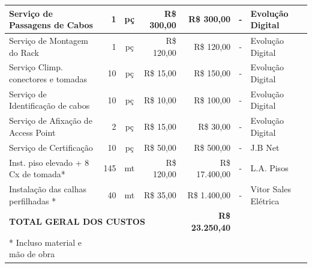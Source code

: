 \documentclass[	DIV=calc,%
							paper=a4,%
							fontsize=12pt,%
							onecolumn]{scrartcl}	 					%
\begin{document}
\begin{table}[H]
{\begin{tabular}{lrcrrll}
		\multicolumn{1}{|l|}{Serviço de Passagens de Cabos}        & \multicolumn{1}{r|}{1}             & \multicolumn{1}{c|}{pç}            & \multicolumn{1}{r|}{R\$ 300,00}           & \multicolumn{1}{r|}{R\$ 300,00}        & \multicolumn{1}{c|}{-}              & \multicolumn{1}{l|}{Evolução Digital}     \\ \hline
		\multicolumn{1}{|l|}{Serviço de Montagem do Rack}          & \multicolumn{1}{r|}{1}             & \multicolumn{1}{c|}{pç}            & \multicolumn{1}{r|}{R\$ 120,00}           & \multicolumn{1}{r|}{R\$ 120,00}        & \multicolumn{1}{c|}{-}              & \multicolumn{1}{l|}{Evolução Digital}     \\ \hline
		\multicolumn{1}{|l|}{Serviço Climp. conectores e tomadas}  & \multicolumn{1}{r|}{10}            & \multicolumn{1}{c|}{pç}            & \multicolumn{1}{r|}{R\$ 15,00}            & \multicolumn{1}{r|}{R\$ 150,00}        & \multicolumn{1}{c|}{-}              & \multicolumn{1}{l|}{Evolução Digital}     \\ \hline
		\multicolumn{1}{|l|}{Serviço de Identificação de cabos}    & \multicolumn{1}{r|}{10}            & \multicolumn{1}{c|}{pç}            & \multicolumn{1}{r|}{R\$ 10,00}            & \multicolumn{1}{r|}{R\$ 100,00}        & \multicolumn{1}{c|}{-}              & \multicolumn{1}{l|}{Evolução Digital}     \\ \hline
		\multicolumn{1}{|l|}{Serviço de Afixação de Access Point}  & \multicolumn{1}{r|}{2}             & \multicolumn{1}{c|}{pç}            & \multicolumn{1}{r|}{R\$ 15,00}            & \multicolumn{1}{r|}{R\$ 30,00}         & \multicolumn{1}{c|}{-}              & \multicolumn{1}{l|}{Evolução Digital}     \\ \hline
		\multicolumn{1}{|l|}{Serviço de Certificação}              & \multicolumn{1}{r|}{10}            & \multicolumn{1}{c|}{pç}            & \multicolumn{1}{r|}{R\$ 50,00}            & \multicolumn{1}{r|}{R\$ 500,00}        & \multicolumn{1}{c|}{-}              & \multicolumn{1}{l|}{J.B Net}              \\ \hline
		\multicolumn{1}{|l|}{Inst. piso elevado + 8 Cx de tomada*} & \multicolumn{1}{r|}{145}           & \multicolumn{1}{c|}{mt}            & \multicolumn{1}{r|}{R\$ 120,00}           & \multicolumn{1}{r|}{R\$ 17.400,00}     & \multicolumn{1}{c|}{-}              & \multicolumn{1}{l|}{L.A. Pisos}           \\ \hline
		\multicolumn{1}{|l|}{Instalação das calhas perfilhadas *}  & \multicolumn{1}{r|}{40}            & \multicolumn{1}{c|}{mt}            & \multicolumn{1}{r|}{R\$ 35,00}            & \multicolumn{1}{r|}{R\$ 1.400,00}      & \multicolumn{1}{c|}{-}              & \multicolumn{1}{l|}{Vitor Sales Elétrica} \\ \hline
		\multicolumn{4}{l}{\textbf{TOTAL GERAL DOS CUSTOS}}                                                                                                                              & \textbf{R\$ 23.250,40}                 & \multicolumn{2}{l}{}                                                            \\ \hline
		\** Incluso material e mão de obra
	\end{tabular}}
\end{table}
\end{document}

